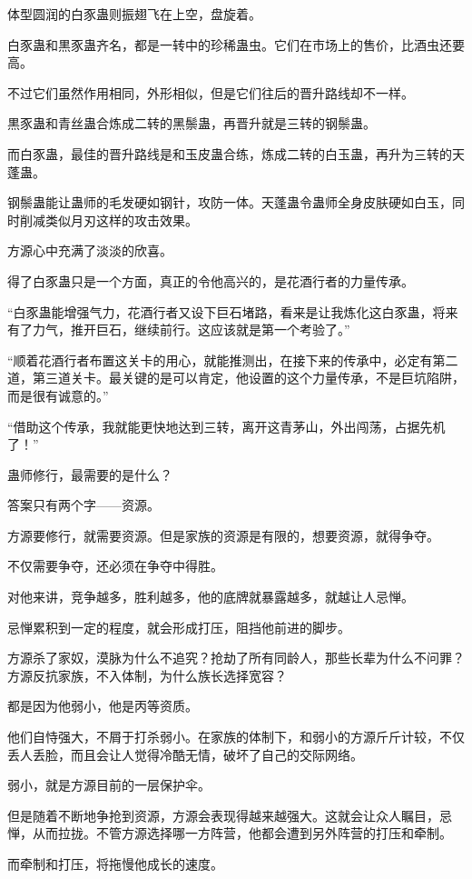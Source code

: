 \begin{this_body}
体型圆润的白豕蛊则振翅飞在上空，盘旋着。

白豕蛊和黒豕蛊齐名，都是一转中的珍稀蛊虫。它们在市场上的售价，比酒虫还要高。

不过它们虽然作用相同，外形相似，但是它们往后的晋升路线却不一样。

黒豕蛊和青丝蛊合炼成二转的黑鬃蛊，再晋升就是三转的钢鬃蛊。

而白豕蛊，最佳的晋升路线是和玉皮蛊合练，炼成二转的白玉蛊，再升为三转的天蓬蛊。

钢鬃蛊能让蛊师的毛发硬如钢针，攻防一体。天蓬蛊令蛊师全身皮肤硬如白玉，同时削减类似月刃这样的攻击效果。

方源心中充满了淡淡的欣喜。

得了白豕蛊只是一个方面，真正的令他高兴的，是花酒行者的力量传承。

“白豕蛊能增强气力，花酒行者又设下巨石堵路，看来是让我炼化这白豕蛊，将来有了力气，推开巨石，继续前行。这应该就是第一个考验了。”

“顺着花酒行者布置这关卡的用心，就能推测出，在接下来的传承中，必定有第二道，第三道关卡。最关键的是可以肯定，他设置的这个力量传承，不是巨坑陷阱，而是很有诚意的。”

“借助这个传承，我就能更快地达到三转，离开这青茅山，外出闯荡，占据先机了！”

蛊师修行，最需要的是什么？

答案只有两个字——资源。

方源要修行，就需要资源。但是家族的资源是有限的，想要资源，就得争夺。

不仅需要争夺，还必须在争夺中得胜。

对他来讲，竞争越多，胜利越多，他的底牌就暴露越多，就越让人忌惮。

忌惮累积到一定的程度，就会形成打压，阻挡他前进的脚步。

方源杀了家奴，漠脉为什么不追究？抢劫了所有同龄人，那些长辈为什么不问罪？方源反抗家族，不入体制，为什么族长选择宽容？

都是因为他弱小，他是丙等资质。

他们自恃强大，不屑于打杀弱小。在家族的体制下，和弱小的方源斤斤计较，不仅丢人丢脸，而且会让人觉得冷酷无情，破坏了自己的交际网络。

弱小，就是方源目前的一层保护伞。

但是随着不断地争抢到资源，方源会表现得越来越强大。这就会让众人瞩目，忌惮，从而拉拢。不管方源选择哪一方阵营，他都会遭到另外阵营的打压和牵制。

而牵制和打压，将拖慢他成长的速度。


\end{this_body}
